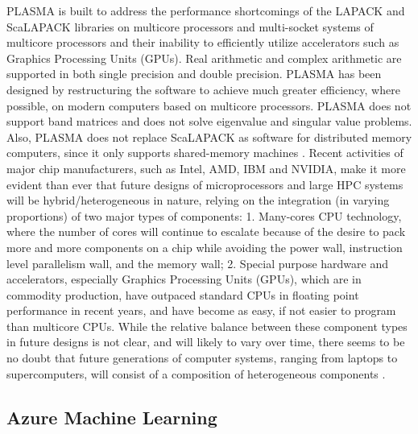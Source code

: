     PLASMA is built to address the performance shortcomings of the
    LAPACK and ScaLAPACK libraries on multicore processors and
    multi-socket systems of multicore processors and their inability
    to efficiently utilize accelerators such as Graphics Processing
    Units (GPUs). Real arithmetic and complex arithmetic are supported
    in both single precision and double precision.  PLASMA has been
    designed by restructuring the software to achieve much greater
    efficiency, where possible, on modern computers based on multicore
    processors. PLASMA does not support band matrices and does not
    solve eigenvalue and singular value problems. Also, PLASMA does
    not replace ScaLAPACK as software for distributed memory
    computers, since it only supports shared-memory
    machines \cite{paper-plasma-magma-1} \cite{www-plasma-1}. Recent
    activities of major chip manufacturers, such as Intel, AMD, IBM
    and NVIDIA, make it more evident than ever that future designs of
    microprocessors and large HPC systems will be hybrid/heterogeneous
    in nature, relying on the integration (in varying proportions) of
    two major types of components: \cite{paper-plasma-magma-2}
    \cite{paper-plasma-magma-3}
    1. Many-cores CPU technology, where the number of cores will
    continue to escalate because of the desire to pack more and more
    components on a chip while avoiding the power wall, instruction
    level parallelism wall, and the memory wall;
    2. Special purpose hardware and accelerators, especially Graphics
    Processing Units (GPUs), which are in commodity production, have
    outpaced standard CPUs in floating point performance in recent
    years, and have become as easy, if not easier to program than
    multicore CPUs.  While the relative balance between these
    component types in future designs is not clear, and will likely to
    vary over time, there seems to be no doubt that future generations
    of computer systems, ranging from laptops to supercomputers, will
    consist of a composition of heterogeneous components
    \cite{paper-plasma-magma-4}\cite{paper-plasma-magma-5}\cite{paper-plasma-magma-6}.

\subsection{Azure Machine Learning}
    
